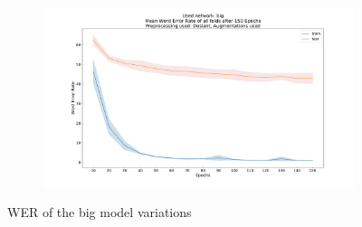 \documentclass{article}
\begin{document}
\begin{minipage}[H]{1\linewidth}
\begin{figure}[H]
\begin{adjustwidth}{-8em}{-8em}
\begin{subfigure}{0.7\textwidth}
    \end{subfigure}
    \begin{subfigure}{0.7\textwidth}
        \centering
        \includegraphics[width=\textwidth]{Deslant_big_150_augmentations_wer}
    \end{subfigure}
    \end{adjustwidth}
\caption{WER of the big model variations}

\label{fig:WERBig}
\end{figure}
\end{minipage}
\end{document}
